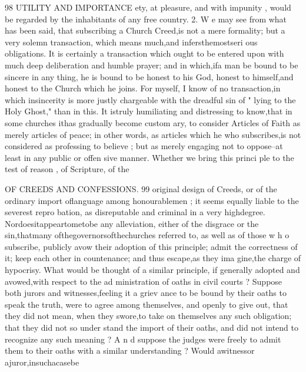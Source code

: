 \documentclass[
]{book}
\begin{document}
98 UTILITY AND IMPORTANCE
ety, at pleasure, and with impunity , would be regarded by the inhabitants of any free country.
2. W e may see from what has been said, that subscribing a Church Creed,is not a mere formality; but a very solemn transaction, which means much,and infersthemostseri ous obligations. It is certainly a transaction which ought to be entered upon with much deep deliberation and humble prayer; and in which,ifa man be bound to be sincere in any
thing, he is bound to be honest to his God, honest to himself,and honest to the Church
which he joins. For myself, I know of no transaction,in which insincerity is more justly
chargeable with the dreadful sin of " lying to the Holy Ghost," than in this. It istruly
humiliating and distressing to know,that in some churches ithas gradually become custom ary, to consider Articles of Faith as merely articles of peace; in other words, as articles which he who subscribes,is not considered as professing to believe ; but as merely engaging not to oppose--at least in any public or offen sive manner. Whether we bring this princi
ple to the test of reason , of Scripture, of the

OF CREEDS AND CONFESSIONS. 99
original design of Creeds, or of the ordinary import oflanguage among honourablemen ; it seems equally liable to the severest repro bation, as disreputable and criminal in a very
highdegree. Nordoesitappeartometobe any alleviation, either of the disgrace or the
sin,thatmany ofthegovernorsofthechurches
referred to, as well as of those w h o subscribe,
publicly avow their adoption of this principle;
admit the correctness of it; keep each other
in countenance; and thus escape,as they ima
gine,the charge of hypocrisy. What would
be thought of a similar principle, if generally adopted and avowed,with respect to the ad
ministration of oaths in civil courts ? Suppose both jurors and witnesses,feeling it a griev ance to be bound by their oaths to speak the truth, were to agree among themselves, and openly to give out, that they did not mean, when they swore,to take on themselves any such obligation; that they did not so under
stand the import of their oaths, and did not intend to recognize any such meaning ? A n d suppose the judges were freely to admit them to their oaths with a similar understanding ? Would awitnessor ajuror,insuchacasebe
\end{document}
